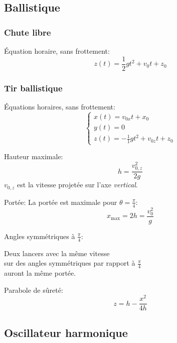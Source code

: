 \documentclass{article}
\numberwithin{equation}{section}
\begin{document}
\subsection{Ballistique}
\subsubsection{Chute libre}
Équation horaire, sans frottement:
\begin{equation}
	\boxed{z(t) = \frac{1}{2} gt^2 + v_0t + z_0}
\end{equation}

\subsubsection{Tir ballistique}
Équations horaires, sans frottement:
\begin{equation}
	\boxed{\begin{cases}
		x(t) = v_{0x}t + x_0 \\
		y(t) = 0 \\
		z(t) = -\frac{1}{1}gt^2 + v_{0z}t + z_0
	\end{cases}}
\end{equation}

Hauteur maximale:
\begin{equation}
	\boxed{h = \dfrac{v_{0,z}^2}{2g}}
\end{equation}
\(v_{0,z}\) est la vitesse projetée sur l'axe \emph{vertical}.

Portée:
La portée est maximale pour \(\theta = \frac{\pi}{4}\):
\begin{equation}
	x_{\text{max}} = 2h = \dfrac{v_0^2}{g}
\end{equation}

Angles symmétriques à \(\frac{\pi}{4}\):
\begin{center}
	Deux lancers avec la même vitesse \\ sur des angles symmétriques par rapport à \(\frac{\pi}{4}\) \\ auront la même portée.
\end{center}

Parabole de sûreté:
\begin{equation}
	\boxed{z = h - \dfrac{x^2}{4h}}
\end{equation}


\subsection{Oscillateur harmonique}
\end{document}

